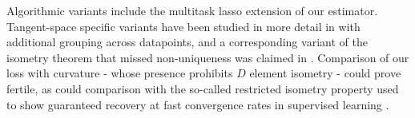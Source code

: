 Algorithmic variants include the multitask lasso \cite{ Hastie2015-qa} extension of our estimator.
Tangent-space specific variants have been studied in more detail in \cite{Koelle2022-ju, Koelle2024-no} with additional grouping across datapoints, and a corresponding variant of the isometry theorem that missed non-uniqueness was claimed in \cite{Koelle2022-lp}.
Comparison of our loss with curvature - whose presence prohibits $D$ element isometry - could prove fertile, as could comparison with the so-called restricted isometry property used to show guaranteed recovery at fast convergence rates in supervised learning \cite{Candes2005-dd, Hastie2015-qa}.